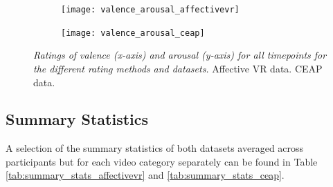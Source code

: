 \documentclass[11pt, letterpaper]{article}
\begin{document}
\begin{figure}
    \centering
    \begin{subfigure}[t]{0.49\textwidth}
        \centering
        \texttt{[image: valence\_arousal\_affectivevr]} 
        \caption{} \label{fig:valence_arousal_affectivevr}
    \end{subfigure}
    \hfill
    \begin{subfigure}[t]{0.49\textwidth}
        \centering
        \texttt{[image: valence\_arousal\_ceap]} 
        \caption{} \label{fig:valence_arousal_ceap}
    \end{subfigure}
    \caption{\textit{Ratings of valence (x-axis) and arousal (y-axis) for all timepoints for the different rating methods and datasets.}  Affective VR data.  CEAP data.}
    \label{fig:valence_arousal}
\end{figure}

\newpage
\newpage

\subsection{Summary Statistics}
A selection of the summary statistics of both datasets averaged across participants but for each video category separately can be found in Table \ref{tab:summary_stats_affectivevr} and \ref{tab:summary_stats_ceap}.
\end{document}
